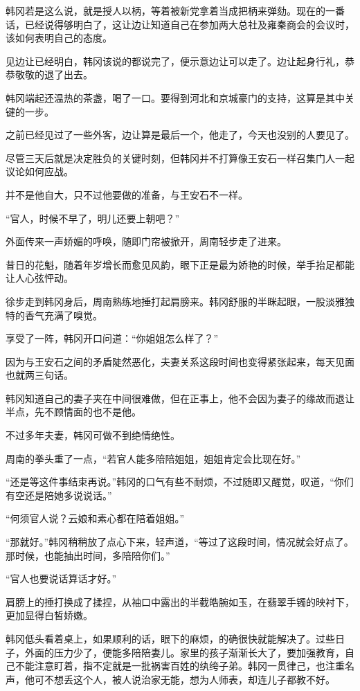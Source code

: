 韩冈若是这么说，就是授人以柄，等着被新党拿着当成把柄来弹劾。现在的一番话，已经说得够明白了，这让边让知道自己在参加两大总社及雍秦商会的会议时，该如何表明自己的态度。

见边让已经明白，韩冈该说的都说完了，便示意边让可以走了。边让起身行礼，恭恭敬敬的退了出去。

韩冈端起还温热的茶盏，喝了一口。要得到河北和京城豪门的支持，这算是其中关键的一步。

之前已经见过了一些外客，边让算是最后一个，他走了，今天也没别的人要见了。

尽管三天后就是决定胜负的关键时刻，但韩冈并不打算像王安石一样召集门人一起议论如何应战。

并不是他自大，只不过他要做的准备，与王安石不一样。

“官人，时候不早了，明儿还要上朝吧？”

外面传来一声娇媚的呼唤，随即门帘被掀开，周南轻步走了进来。

昔日的花魁，随着年岁增长而愈见风韵，眼下正是最为娇艳的时候，举手抬足都能让人心弦怦动。

徐步走到韩冈身后，周南熟练地捶打起肩膀来。韩冈舒服的半眯起眼，一股淡雅独特的香气充满了嗅觉。

享受了一阵，韩冈开口问道：“你姐姐怎么样了？”

因为与王安石之间的矛盾陡然恶化，夫妻关系这段时间也变得紧张起来，每天见面也就两三句话。

韩冈知道自己的妻子夹在中间很难做，但在正事上，他不会因为妻子的缘故而退让半点，先不顾情面的也不是他。

不过多年夫妻，韩冈可做不到绝情绝性。

周南的拳头重了一点，“若官人能多陪陪姐姐，姐姐肯定会比现在好。”

“还是等这件事结束再说。”韩冈的口气有些不耐烦，不过随即又醒觉，叹道，“你们有空还是陪她多说说话。”

“何须官人说？云娘和素心都在陪着姐姐。”

“那就好。”韩冈稍稍放了点心下来，轻声道，“等过了这段时间，情况就会好点了。那时候，也能抽出时间，多陪陪你们。”

“官人也要说话算话才好。”

肩膀上的捶打换成了揉捏，从袖口中露出的半截皓腕如玉，在翡翠手镯的映衬下，更加显得白皙娇嫩。

韩冈低头看着桌上，如果顺利的话，眼下的麻烦，的确很快就能解决了。过些日子，外面的压力少了，便能多陪陪妻儿。家里的孩子渐渐长大了，要加强教育，自己不能注意盯着，指不定就是一批祸害百姓的纨绔子弟。韩冈一贯律己，也注重名声，他可不想丢这个人，被人说治家无能，想为人师表，却连儿子都教不好。

